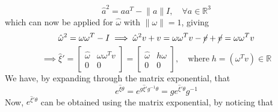 \begin{equation*}
      {\hat{a}}^2 = a a^T - \lVert a \rVert I, \quad \forall a \in \mathbb{R}^3
\end{equation*}
which can now be applied for \( \hat \omega \) with \( \lVert \omega \rVert = 1 \), giving
\begin{equation*}
      {\hat{\omega}}^2
      =
      \omega \omega^T - I
      \implies
      {\hat{\omega}}^2 v + v
      =
      \omega \omega^T v - \cancel{v} + \cancel{v}
      =
      \omega \omega^T v
\end{equation*}
\begin{equation*}
      \implies
      \hat{\xi}'
      =
      \begin{bmatrix}
            \hat \omega & \omega \omega^T v \\
            0           & 0
      \end{bmatrix}
      =
      \begin{bmatrix}
            \hat \omega & h \omega \\
            0           & 0
      \end{bmatrix},
      \quad \text{where} \; h = (\omega^T v) \in \mathbb{R}
\end{equation*}
We have, by expanding through the matrix exponential, that
\begin{equation*}
      e^{\hat{\xi} \theta}
      =
      e^{g \hat{\xi}' g^{-1} \theta}
      =
      g e^{\hat{\xi}' \theta} g^{-1}
\end{equation*}
Now, \( e^{\hat{\xi}' \theta} \) can be obtained using the matrix exponential, by noticing that
